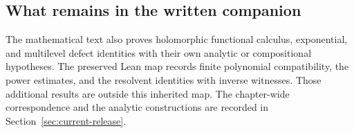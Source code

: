 \subsection{What remains in the written companion}

The mathematical text also proves holomorphic functional calculus, exponential, and multilevel defect identities with their own analytic or compositional hypotheses. The preserved Lean map records finite polynomial compatibility, the power estimates, and the resolvent identities with inverse witnesses. Those additional results are outside this inherited map. The chapter-wide correspondence and the analytic constructions are recorded in Section~\ref{sec:current-release}.
